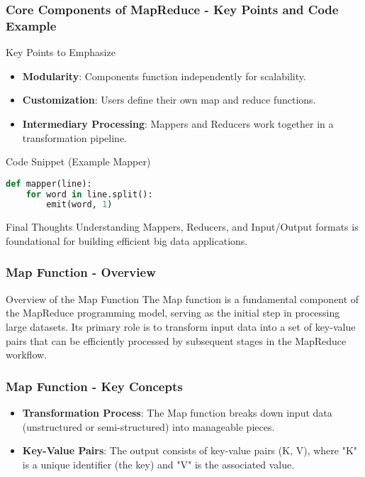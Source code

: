 \documentclass[aspectratio=169]{beamer}
\begin{document}
\begin{frame}[fragile]
    \frametitle{Core Components of MapReduce - Key Points and Code Example}
    \begin{block}{Key Points to Emphasize}
        \begin{itemize}
            \item \textbf{Modularity}: Components function independently for scalability.
            \item \textbf{Customization}: Users define their own map and reduce functions.
            \item \textbf{Intermediary Processing}: Mappers and Reducers work together in a transformation pipeline.
        \end{itemize}
    \end{block}

    \begin{block}{Code Snippet (Example Mapper)}
        \begin{lstlisting}[language=Python]
def mapper(line):
    for word in line.split():
        emit(word, 1)
        \end{lstlisting}
    \end{block}
    
    \begin{block}{Final Thoughts}
        Understanding Mappers, Reducers, and Input/Output formats is foundational for building efficient big data applications.
    \end{block}
\end{frame}

\begin{frame}[fragile]
    \frametitle{Map Function - Overview}
    \begin{block}{Overview of the Map Function}
        The Map function is a fundamental component of the MapReduce programming model, 
        serving as the initial step in processing large datasets. Its primary role is to 
        transform input data into a set of key-value pairs that can be efficiently processed 
        by subsequent stages in the MapReduce workflow.
    \end{block}
\end{frame}

\begin{frame}[fragile]
    \frametitle{Map Function - Key Concepts}
    \begin{itemize}
        \item \textbf{Transformation Process}: The Map function breaks down input data 
        (unstructured or semi-structured) into manageable pieces.
        
        \item \textbf{Key-Value Pairs}: The output consists of key-value pairs (K, V), where 
        "K" is a unique identifier (the key) and "V" is the associated value.
    \end{itemize}
\end{frame}
\end{document}
